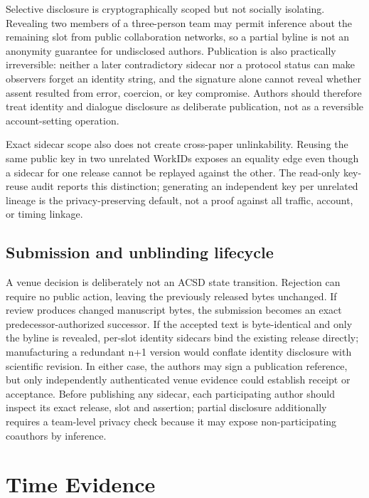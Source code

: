\documentclass[conference,compsoc]{IEEEtran}
\begin{document}
Selective disclosure is cryptographically scoped but not socially isolating.
Revealing two members of a three-person team may permit inference about the
remaining slot from public collaboration networks, so a partial byline is not
an anonymity guarantee for undisclosed authors. Publication is also practically
irreversible: neither a later contradictory sidecar nor a protocol status can
make observers forget an identity string, and the signature alone cannot reveal
whether assent resulted from error, coercion, or key compromise. Authors should
therefore treat identity and dialogue disclosure as deliberate publication,
not as a reversible account-setting operation.

Exact sidecar scope also does not create cross-paper unlinkability. Reusing the
same public key in two unrelated WorkIDs exposes an equality edge even though a
sidecar for one release cannot be replayed against the other. The read-only
key-reuse audit reports this distinction; generating an independent key per
unrelated lineage is the privacy-preserving default, not a proof against all
traffic, account, or timing linkage.

\subsection{Submission and unblinding lifecycle}

A venue decision is deliberately not an ACSD state transition. Rejection can
require no public action, leaving the previously released bytes unchanged. If
review produces changed manuscript bytes, the submission becomes an exact
predecessor-authorized successor. If the accepted text is byte-identical and
only the byline is revealed, per-slot identity sidecars bind the existing
release directly; manufacturing a redundant n+1 version would conflate
identity disclosure with scientific revision. In either case, the authors may
sign a publication reference, but only independently authenticated venue
evidence could establish receipt or acceptance. Before publishing any sidecar,
each participating author should inspect its exact release, slot and assertion;
partial disclosure additionally requires a team-level privacy check because it
may expose non-participating coauthors by inference.

\section{Time Evidence}
\end{document}
